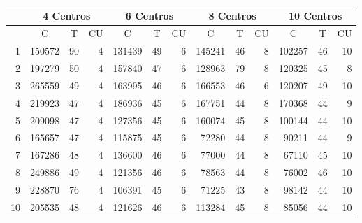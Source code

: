 \documentclass{article}
\begin{document}
  \begin{center}
    \begin{tabular}{ | r | r | r | r | r | r | r | r | r | r | r | r | r | }
      \hline
      \rowcolor{DarkGrey}
      & \multicolumn{3}{|c|}{4 Centros} & \multicolumn{3}{c|}{6 Centros} & \multicolumn{3}{|c|}{8 Centros} & \multicolumn{3}{|c|}{10 Centros} \\ \hline
      \rowcolor{DarkGrey}
      \multicolumn{1}{|c|}{Réplica} & \multicolumn{1}{|c|}{C} & \multicolumn{1}{|c|}{T} & \multicolumn{1}{|c|}{CU} & \multicolumn{1}{|c|}{C} & \multicolumn{1}{|c|}{T} & \multicolumn{1}{|c|}{CU} & \multicolumn{1}{|c|}{C} & \multicolumn{1}{|c|}{T} & \multicolumn{1}{|c|}{CU} & \multicolumn{1}{|c|}{C} & \multicolumn{1}{|c|}{T} & \multicolumn{1}{|c|}{CU} \\ \hline \hline
      1 & 150572 & 90 & 4 & 131439 & 49 & 6 & 145241 & 46 & 8 & 102257 & 46 & 10 \\ \hline
      \rowcolor{LightGrey}
      2 & 197279 & 50 & 4 & 157840 & 47 & 6 & 128963 & 79 & 8 & 120325 & 45 & 8 \\ \hline
      3 & 265559 & 49 & 4 & 163995 & 46 & 6 & 166553 & 46 & 6 & 120207 & 49 & 10 \\ \hline
      \rowcolor{LightGrey}
      4 & 219923 & 47 & 4 & 186936 & 45 & 6 & 167751 & 44 & 8 & 170368 & 44 & 9\\ \hline
      5 & 209098 & 47 & 4 & 127356 & 45 & 6 & 160074 & 45 & 8 & 100144 & 44 & 10 \\ \hline
      \rowcolor{LightGrey}
      6 & 165657 & 47 & 4 & 115875 & 45 & 6 & 72280 & 44 & 8 & 90211 & 44 & 9 \\ \hline
      7 & 167286 & 48 & 4 & 136600 & 46 & 6 & 77000 & 44 & 8 & 67110 & 45 & 10 \\ \hline
      \rowcolor{LightGrey}
      8 & 249886 & 49 & 4 & 121356 & 46 & 6 & 78563 & 44 & 8 & 76002 & 46 & 10 \\ \hline
      9 & 228870 & 76 & 4 & 106391 & 45 & 6 & 71225 & 43 & 8 & 98142 & 44 & 10 \\ \hline
      \rowcolor{LightGrey}
      10 & 205535 & 48 & 4 & 121626 & 46 & 6 & 113284 & 45 & 8 & 85056 & 44 & 10\\ \hline
    \end{tabular}
    \label{table:T5}
  \end{center}
\end{document}
